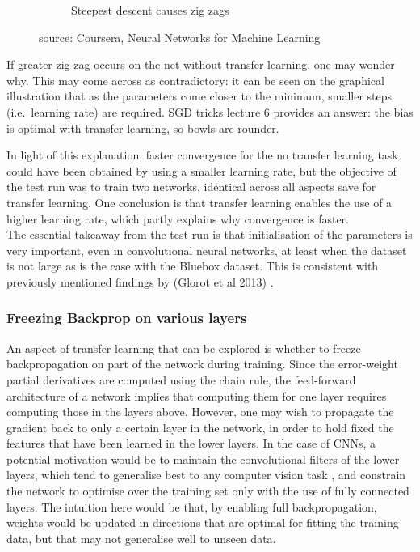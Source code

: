 \documentclass[a4paper,11pt]{article}
\begin{document}
\begin{figure}[h!]
\begin{subfigure}{.5\textwidth}
		\caption{Steepest descent causes zig zags}
	\end{subfigure}
	\caption{source: Coursera, Neural Networks for Machine Learning}
\end{figure}

If greater zig-zag occurs on the net without transfer learning, one may wonder why. This may come across as contradictory: it can be seen on the graphical illustration that as the parameters come closer to the minimum, smaller steps (i.e.\ learning rate) are required. SGD tricks lecture 6 provides an answer: the bias is optimal with transfer learning, so bowls are rounder.

In light of this explanation, faster convergence for the no transfer learning task could have been obtained by using a smaller learning rate, but the objective of the test run was to train two networks, identical across all aspects save for transfer learning. One conclusion is that transfer learning enables the use of a higher learning rate, which partly explains why convergence is faster. \\

The essential takeaway from the test run is that initialisation of the parameters is very important, even in convolutional neural networks, at least when the dataset is not large as is the case with the Bluebox dataset. This is consistent with previously mentioned findings by (Glorot et al 2013) \cite{rectifier}. \\


\subsubsection{Freezing Backprop on various layers}

An aspect of transfer learning that can be explored is whether to freeze backpropagation on part of the network during training. Since the error-weight partial derivatives are computed using the chain rule, the feed-forward architecture of a network implies that computing them for one layer requires computing those in the layers above. However, one may wish to propagate the gradient back to only a certain layer in the network, in order to hold fixed the features that have been learned in the lower layers. In the case of CNNs, a potential motivation would be to maintain the convolutional filters of the lower layers, which tend to generalise best to any computer vision task \cite{transfer-learning}, and constrain the network to optimise over the training set only with the use of fully connected layers. The intuition here would be that, by enabling full backpropagation, weights would be updated in directions that are optimal for fitting the training data, but that may not generalise well to unseen data. \\
\end{document}
